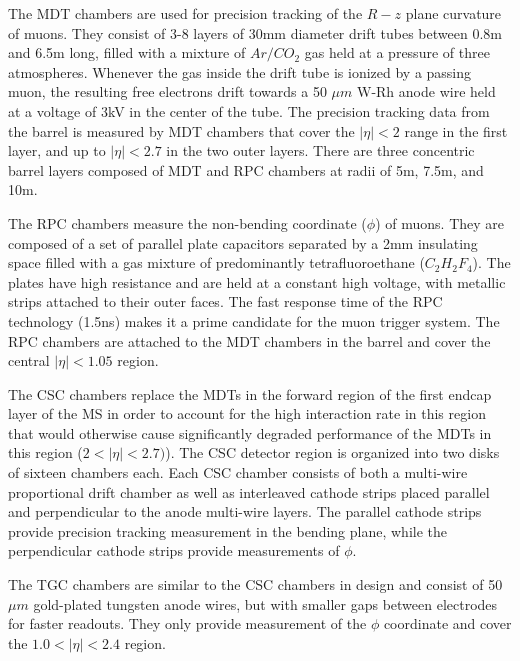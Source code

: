 The MDT chambers are used for precision tracking of the $R-z$ plane curvature of muons.
They consist of 3-8 layers of 30mm diameter drift tubes between 0.8m and 6.5m long, filled with a mixture of $Ar/CO_2$ gas held at a pressure of three atmospheres.
Whenever the gas inside the drift tube is ionized by a passing muon, the resulting free electrons drift towards a 50 $\mu m$ W-Rh anode wire held at a voltage of 3kV in the center of the tube.
The precision tracking data from the barrel is measured by MDT chambers that cover the $|\eta| < 2$ range in the first layer, and up to $|\eta| < 2.7$ in the two outer layers.
There are three concentric barrel layers composed of MDT and RPC chambers at radii of 5m, 7.5m, and 10m.

The RPC chambers measure the non-bending coordinate ($\phi$) of muons.
They are composed of a set of parallel plate capacitors separated by a 2mm insulating space filled with a gas mixture of predominantly tetrafluoroethane ($C_2 H_2 F_4$). 
The plates have high resistance and are held at a constant high voltage, with metallic strips attached to their outer faces.
The fast response time of the RPC technology (1.5ns) makes it a prime candidate for the muon trigger system.
The RPC chambers are attached to the MDT chambers in the barrel and cover the central $|\eta| < 1.05$ region.

The CSC chambers replace the MDTs in the forward region of the first endcap layer of the MS in order to account for the high interaction rate in this region that would otherwise cause significantly degraded performance of the MDTs in this region ($2 < |\eta| < 2.7)$).
The CSC detector region is organized into two disks of sixteen chambers each.
Each CSC chamber consists of both a multi-wire proportional drift chamber as well as interleaved cathode strips placed parallel and perpendicular to the anode multi-wire layers.
The parallel cathode strips provide precision tracking measurement in the bending plane, while the perpendicular cathode strips provide measurements of $\phi$.

The TGC chambers are similar to the CSC chambers in design and consist of 50 $\mu m$ gold-plated tungsten anode wires, but with smaller gaps between electrodes for faster readouts.
They only provide measurement of the $\phi$ coordinate and cover the $1.0 < |\eta| < 2.4$ region.

